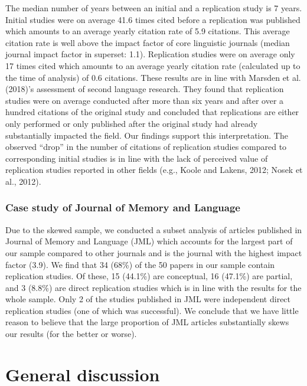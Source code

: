 \documentclass[]{elsarticle} %
\begin{document}
The median number of years between an initial and a replication study is 7 years.
Initial studies were on average 41.6 times cited before a replication was published which amounts to an average yearly citation rate of 5.9 citations.
This average citation rate is well above the impact factor of core linguistic journals (median journal impact factor in superset: 1.1).
Replication studies were on average only 17 times cited which amounts to an average yearly citation rate (calculated up to the time of analysis) of 0.6 citations. These results are in line with Marsden et al. (2018)'s assessment of second language research. They found that replication studies were on average conducted after more than six years and after over a hundred citations of the original study and concluded that replications are either only performed or only published after the original study had already substantially impacted the field. Our findings support this interpretation.
The observed ``drop'' in the number of citations of replication studies compared to corresponding initial studies is in line with the lack of perceived value of replication studies reported in other fields (e.g., Koole and Lakens, 2012; Nosek et al., 2012).

\hypertarget{case-study-of-journal-of-memory-and-language}{%
\subsubsection{Case study of Journal of Memory and Language}\label{case-study-of-journal-of-memory-and-language}}

Due to the skewed sample, we conducted a subset analysis of articles published in Journal of Memory and Language (JML) which accounts for the largest part of our sample compared to other journals and is the journal with the highest impact factor (3.9). We find that 34 (68\%) of the 50 papers in our sample contain replication studies. Of these, 15 (44.1\%) are conceptual, 16 (47.1\%) are partial, and 3 (8.8\%) are direct replication studies which is in line with the results for the whole sample. Only 2 of the studies published in JML were independent direct replication studies (one of which was successful). We conclude that we have little reason to believe that the large proportion of JML articles substantially skews our results (for the better or worse).

\hypertarget{general-discussion}{%
\section{General discussion}\label{general-discussion}}
\end{document}
